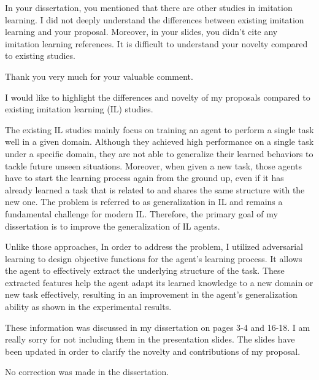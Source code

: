 


\begin{revcomment}
  In your dissertation,
  you mentioned that there are other studies in imitation learning.
  I did not deeply understand the differences between existing imitation learning and your proposal.
  Moreover,
  in your slides,
  you didn't cite any imitation learning references.
  It is difficult to understand your novelty compared to existing studies.
\end{revcomment}

\begin{revresponse}
  Thank you very much for your valuable comment.

  I would like to highlight the differences and novelty of my proposals compared to existing imitation learning (IL) studies.

  The existing IL studies mainly focus on training an agent to perform a single task well in a given domain.
  Although they achieved high performance on a single task under a specific domain,
  they are not able to generalize their learned behaviors to tackle future unseen situations.
  Moreover,
  when given a new task,
  those agents have to start the learning process again from the ground up,
  even if it has already learned a task that is related to and shares the same structure with the new one.
  The problem is referred to as generalization in IL and remains a fundamental challenge for modern IL.
  Therefore,
  the primary goal of my dissertation is to improve the generalization of IL agents.

  Unlike those approaches,
  In order to address the problem,
  I utilized adversarial learning to design objective functions for the agent's learning process.
  It allows the agent to effectively extract the underlying structure of the task.
  These extracted features help the agent adapt its learned knowledge to a new domain or new task effectively, resulting in an improvement in the agent's generalization ability as shown in the experimental results.

  These information was discussed in my dissertation on pages 3-4 and 16-18.
  I am really sorry for not including them in the presentation slides.
  The slides have been updated in order to clarify the novelty and contributions of my proposal.

  \begin{correction}
    No correction was made in the dissertation.
  \end{correction}
\end{revresponse}


